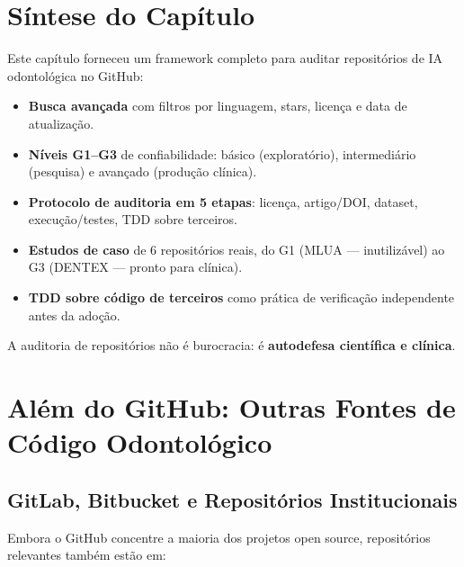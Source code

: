 

\section{Síntese do Capítulo}

Este capítulo forneceu um framework completo para auditar repositórios
de IA odontológica no GitHub:

\begin{itemize}
  \item \textbf{Busca avançada} com filtros por linguagem, stars, licença
    e data de atualização.
  \item \textbf{Níveis G1--G3} de confiabilidade: básico (exploratório),
    intermediário (pesquisa) e avançado (produção clínica).
  \item \textbf{Protocolo de auditoria em 5 etapas}: licença, artigo/DOI,
    dataset, execução/testes, TDD sobre terceiros.
  \item \textbf{Estudos de caso} de 6 repositórios reais, do G1 (MLUA —
    inutilizável) ao G3 (DENTEX — pronto para clínica).
  \item \textbf{TDD sobre código de terceiros} como prática de verificação
    independente antes da adoção.
\end{itemize}

A auditoria de repositórios não é burocracia: é \textbf{autodefesa
científica e clínica}.

\section{Além do GitHub: Outras Fontes de Código Odontológico}

\subsection{GitLab, Bitbucket e Repositórios Institucionais}

Embora o GitHub concentre a maioria dos projetos open source, repositórios
relevantes também estão em:

